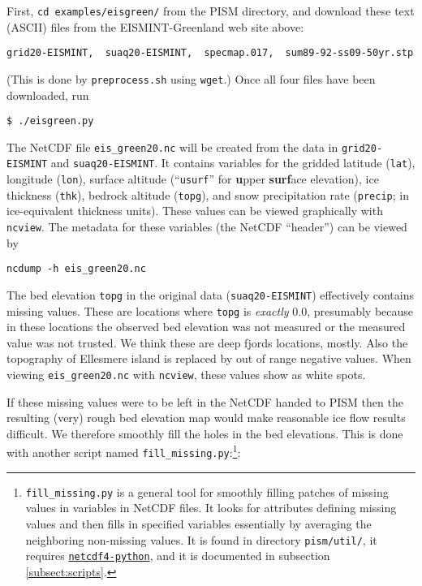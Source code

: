 First, \texttt{cd examples/eisgreen/} from the PISM directory, and download these text (ASCII) files from the EISMINT-Greenland web site above: 

\begin{verbatim}
grid20-EISMINT,  suaq20-EISMINT,  specmap.017,  sum89-92-ss09-50yr.stp
\end{verbatim}

\noindent (This is done by \texttt{preprocess.sh} using \texttt{wget}.) Once all four files have been downloaded, run

\begin{verbatim}
$ ./eisgreen.py
\end{verbatim}%

\noindent The NetCDF file \texttt{eis_green20.nc} will be created from the data in \texttt{grid20-EISMINT} and \texttt{suaq20-EISMINT}.  It contains variables for the gridded latitude (\texttt{lat}), longitude (\texttt{lon}), surface altitude (``\texttt{usurf}'' for \textbf{u}pper \textbf{surf}ace elevation), ice thickness (\texttt{thk}), bedrock altitude (\texttt{topg}), and snow precipitation rate (\texttt{precip}; in ice-equivalent thickness units).  These values can be viewed graphically with \texttt{ncview}.  The metadata for these variables (the NetCDF ``header'') can be viewed by

\begin{verbatim}
ncdump -h eis_green20.nc
\end{verbatim}

The bed elevation \texttt{topg} in the original data (\texttt{suaq20-EISMINT}) effectively contains missing values.  These are locations where \texttt{topg} is \emph{exactly} $0.0$, presumably because in these locations the observed bed elevation was not measured or the measured value was not trusted.  We think these are deep fjords locations, mostly.  Also the topography of Ellesmere island is replaced by out of range negative values.  When viewing \texttt{eis_green20.nc} with \texttt{ncview}, these values show as white spots.  

If these missing values were to be left in the NetCDF handed to PISM then the resulting (very) rough bed elevation map would make reasonable ice flow results difficult.  We therefore smoothly fill the holes in the bed elevations.  This is done with another script named \texttt{fill_missing.py}:\footnote{\texttt{fill_missing.py} is a general tool for smoothly filling patches of missing values in variables in NetCDF files.  It looks for attributes defining missing values and then fills in specified variables essentially by averaging the neighboring non-missing values.  It is found in directory \texttt{pism/util/}, it requires \href{http://code.google.com/p/netcdf4-python/}{\texttt{netcdf4-python}}, and it is documented in subsection \ref{subsect:scripts}.}:

